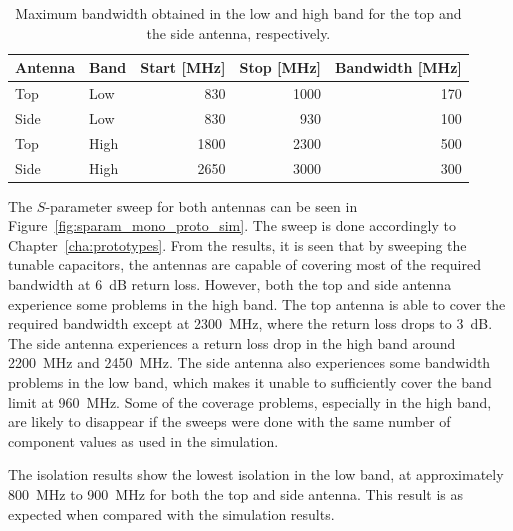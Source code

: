     \begin{table}
      \centering
      \begin{tabular}{|l|l|r|r|r|}
        \hline
        Antenna & Band & Start [MHz] & Stop [MHz] & Bandwidth [MHz] \\
        \hline
        Top     & Low  & 830        & 1000       & 170 \\
        Side    & Low  & 830         & 930        & 100 \\
        \hline
        Top     & High & 1800        & 2300       & 500 \\
        Side    & High & 2650        & 3000       & 300 \\
        \hline
      \end{tabular}
      \caption{Maximum bandwidth obtained in the low and high band for the top and the side antenna, respectively.}
      \label{tab:bw_sol1_proto}
    \end{table}

The $S$-parameter sweep for both antennas can be seen in Figure~\ref{fig:sparam_mono_proto_sim}. The sweep is done accordingly to Chapter~\ref{cha:prototypes}. From the results, it is seen that by sweeping the tunable capacitors, the antennas are capable of covering most of the required bandwidth at \SI{6}{dB} return loss. However, both the top and side antenna experience some problems in the high band. The top antenna is able to cover the required bandwidth except at \SI{2300}{MHz}, where the return loss drops to \SI{3}{dB}. The side antenna experiences a return loss drop in the high band around \SI{2200}{MHz} and \SI{2450}{MHz}. The side antenna also experiences some bandwidth problems in the low band, which makes it unable to sufficiently cover the band limit at \SI{960}{MHz}. Some of the coverage problems, especially in the high band, are likely to disappear if the sweeps were done with the same number of component values as used in the simulation.   

The isolation results show the lowest isolation in the low band, at approximately \SI{800}{MHz} to \SI{900}{MHz} for both the top and side antenna. This result is as expected when compared with the simulation results.

